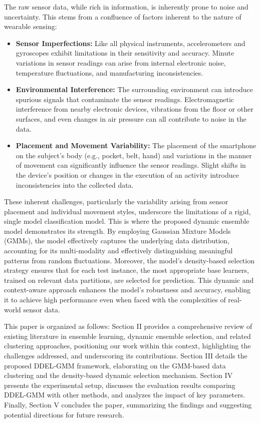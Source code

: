 \documentclass[lettersize,journal]{IEEEtran}
\newcommand{\greenhighlight}[1]{\textcolor{highlightgreen}{#1}}
\begin{document}
	
	The raw sensor data, while rich in information, is inherently prone to noise and uncertainty. This stems from a confluence of factors inherent to the nature of wearable sensing: 
	
	\begin{itemize}
		\item \textbf{Sensor Imperfections:} Like all physical instruments, accelerometers and gyroscopes exhibit limitations in their sensitivity and accuracy. Minute variations in sensor readings can arise from internal electronic noise, temperature fluctuations, and manufacturing inconsistencies. 
		\item \textbf{Environmental Interference:} The surrounding environment can introduce spurious signals that contaminate the sensor readings. Electromagnetic interference from nearby electronic devices, vibrations from the floor or other surfaces, and even changes in air pressure can all contribute to noise in the data. 
		\item \textbf{Placement and Movement Variability:} The placement of the smartphone on the subject's body (e.g., pocket, belt, hand) and variations in the manner of movement can significantly influence the sensor readings. Slight shifts in the device's position or changes in the execution of an activity introduce inconsistencies into the collected data. 
	\end{itemize}

	These inherent challenges, particularly the variability arising from sensor placement and individual movement styles, underscore the limitations of a rigid, single model classification model.
	 This is where the proposed dynamic ensemble model demonstrates its strength. By employing Gaussian Mixture Models (GMMs), the model effectively captures the underlying data distribution, accounting for its multi-modality and effectively distinguishing meaningful patterns from random fluctuations. Moreover, the model’s density-based selection strategy ensures that for each test instance, the most appropriate base learners, trained on relevant data partitions, are selected for prediction. This dynamic and context-aware approach enhances the model's robustness and accuracy, enabling it to achieve high performance even when faced with the complexities of real-world sensor data.
	
	\greenhighlight{
		This paper is organized as follows: 
		Section II provides a comprehensive review of existing literature in ensemble learning, dynamic ensemble selection, and related clustering approaches, positioning our work within this context, highlighting the challenges addressed, and underscoring its contributions. Section III details the proposed DDEL-GMM framework, elaborating on the GMM-based data clustering and the density-based dynamic selection mechanism. Section IV presents the experimental setup, discusses the evaluation results comparing DDEL-GMM with other methods, and analyzes the impact of key parameters. Finally, Section V concludes the paper, summarizing the findings and suggesting potential directions for future research.
	}
\end{document}
